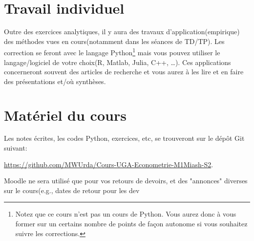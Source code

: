 \section{Travail individuel}
Outre des exercices analytiques, il y aura des travaux d'application(empirique) des méthodes 
vues en cours(notamment dans les séances de TD/TP). Les correction se feront avec le langage 
Python\footnote{Notez que ce cours n'est pas un cours de Python. Vous aurez donc à vous former sur un certains nombre de points 
de façon autonome si vous souhaitez suivre les corrections.} mais vous pouvez utiliser 
le langage/logiciel de votre choix(R, Matlab, Julia, C++, \ldots). Ces applications concerneront souvent 
des articles de recherche et vous aurez à les lire et en faire des présentations et/où synthèses.

\section{Matériel du cours}

Les notes écrites, les codes Python, exercices, etc, se trouveront sur le dépôt Git suivant:

\url{https://github.com/MWUrda/Cours-UGA-Econometrie-M1Miash-S2}.

Moodle ne sera utilisé que pour vos retours de devoirs, et des "annonces" diverses sur le cours(e.g., dates de retour pour les dev


 

